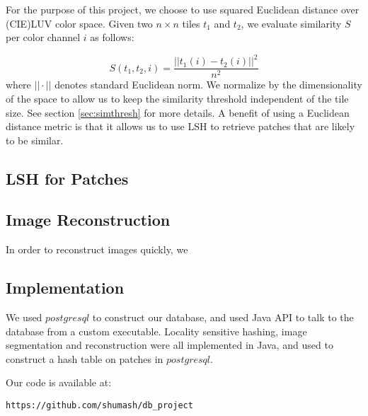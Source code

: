 For the purpose of this project, we choose to use squared Euclidean
distance over (CIE)LUV color space.
Given two $n \times n$ tiles $t_1$ and $t_2$, we evaluate similarity $S$
per color channel $i$ as follows:

\begin{displaymath}
S(t_1, t_2, i) = \frac{||t_1(i) - t_2(i)||^2}{n^2}
\end{displaymath}
where $||\cdot||$ denotes standard Euclidean norm.
We normalize by the dimensionality of the space to allow us to keep the
similarity threshold independent of the tile size. See section \ref{sec:simthresh} for more details.  A benefit of using a Euclidean distance metric is that it allows us to use LSH to retrieve patches that are likely to be similar.

\subsection{LSH for Patches}\label{ssec:lsh}

\subsection{Image Reconstruction}\label{ssec:reconst}

In order to reconstruct images quickly, we

\subsection{Implementation}\label{ssec:impl}
We used $postgresql$ to construct our database, and used
Java API to talk to the database from a custom executable. Locality
sensitive hashing, image segmentation and reconstruction were
all implemented in Java, and used to construct a hash table
on patches in $postgresql$.

Our code is available at:
\begin{verbatim}
https://github.com/shumash/db_project
\end{verbatim}
